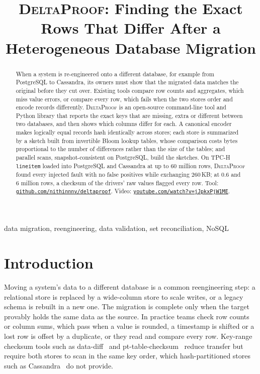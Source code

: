 \documentclass[conference]{IEEEtran}
\newcommand{\sys}{\textsc{DeltaProof}}
\newcommand{\repo}{\href{https://github.com/nithinnnv/deltaproof}{\mbox{\texttt{github.com/nithinnnv/deltaproof}}}}
\newcommand{\video}{\href{https://www.youtube.com/watch?v=jJpkxPjW1ME}{\mbox{\texttt{youtube.com/watch?v=jJpkxPjW1ME}}}}
\begin{document}
\title{\sys{}: Finding the Exact Rows That Differ After a Heterogeneous Database Migration}

\author{
\and
{}
\and
{}
}

\maketitle

\begin{abstract}
When a system is re-engineered onto a different database, for example from PostgreSQL to Cassandra, its owners must show that the migrated data matches the original before they cut over. Existing tools compare row counts and aggregates, which miss value errors, or compare every row, which fails when the two stores order and encode records differently. \sys{} is an open-source command-line tool and Python library that reports the exact keys that are missing, extra or different between two databases, and then shows which columns differ for each. A canonical encoder makes logically equal records hash identically across stores; each store is summarized by a sketch built from invertible Bloom lookup tables, whose comparison costs bytes proportional to the number of differences rather than the size of the tables; and parallel scans, snapshot-consistent on PostgreSQL, build the sketches. On TPC-H \texttt{lineitem} loaded into PostgreSQL and Cassandra at up to 60 million rows, \sys{} found every injected fault with no false positives while exchanging 260\,KB; at 0.6 and 6 million rows, a checksum of the drivers' raw values flagged every row. Tool: \repo{}. Video: \video{}.
\end{abstract}

\begin{IEEEkeywords}
data migration, reengineering, data validation, set reconciliation, NoSQL
\end{IEEEkeywords}

\section{Introduction}
Moving a system's data to a different database is a common reengineering step: a relational store is replaced by a wide-column store to scale writes, or a legacy schema is rebuilt in a new one. The migration is complete only when the target provably holds the same data as the source. In practice teams check row counts or column sums, which pass when a value is rounded, a timestamp is shifted or a lost row is offset by a duplicate, or they read and compare every row. Key-range checksum tools such as data-diff~\cite{datadiff} and pt-table-checksum~\cite{ptchecksum} reduce transfer but require both stores to scan in the same key order, which hash-partitioned stores such as Cassandra~\cite{lakshman2010} do not provide.
\end{document}
